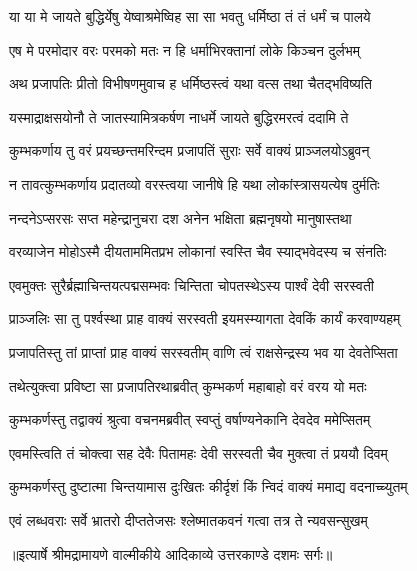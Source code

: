 \twolineshloka
{या या मे जायते बुद्धिर्येषु येष्वाश्रमेष्विह}
{सा सा भवतु धर्मिष्ठा तं तं धर्मं च पालये} %

\twolineshloka
{एष मे परमोदार वरः परमको मतः}
{न हि धर्माभिरक्तानां लोके किञ्चन दुर्लभम्} %

\twolineshloka
{अथ प्रजापतिः प्रीतो विभीषणमुवाच ह}
{धर्मिष्ठस्त्वं यथा वत्स तथा चैतद्भविष्यति} %

\twolineshloka
{यस्माद्राक्षसयोनौ ते जातस्यामित्रकर्षण}
{नाधर्मे जायते बुद्धिरमरत्वं ददामि ते} %

\twolineshloka
{कुम्भकर्णाय तु वरं प्रयच्छन्तमरिन्दम}
{प्रजापतिं सुराः सर्वे वाक्यं प्राञ्जलयोऽब्रुवन्} %

\twolineshloka
{न तावत्कुम्भकर्णाय प्रदातव्यो वरस्त्वया}
{जानीषे हि यथा लोकांस्त्रासयत्येष दुर्मतिः} %

\twolineshloka
{नन्दनेऽप्सरसः सप्त महेन्द्रानुचरा दश}
{अनेन भक्षिता ब्रह्मनृषयो मानुषास्तथा} %

\twolineshloka
{वरव्याजेन मोहोऽस्मै दीयताममितप्रभ}
{लोकानां स्वस्ति चैव स्याद्भवेदस्य च संनतिः} %

\twolineshloka
{एवमुक्तः सुरैर्ब्रह्माचिन्तयत्पद्मसम्भवः}
{चिन्तिता चोपतस्थेऽस्य पार्श्वं देवी सरस्वती} %

\twolineshloka
{प्राञ्जलिः सा तु पर्श्वस्था प्राह वाक्यं सरस्वती}
{इयमस्म्यागता देवकिं कार्यं करवाण्यहम्} %

\twolineshloka
{प्रजापतिस्तु तां प्राप्तां प्राह वाक्यं सरस्वतीम्}
{वाणि त्वं राक्षसेन्द्रस्य भव या देवतेप्सिता} %

\twolineshloka
{तथेत्युक्त्वा प्रविष्टा सा प्रजापतिरथाब्रवीत्}
{कुम्भकर्ण महाबाहो वरं वरय यो मतः} %

\twolineshloka
{कुम्भकर्णस्तु तद्वाक्यं श्रुत्वा वचनमब्रवीत्}
{स्वप्तुं वर्षाण्यनेकानि देवदेव ममेप्सितम्} %

\twolineshloka
{एवमस्त्विति तं चोक्त्वा सह देवैः पितामहः}
{देवी सरस्वती चैव मुक्त्वा तं प्रययौ दिवम्} %

\twolineshloka
{कुम्भकर्णस्तु दुष्टात्मा चिन्तयामास दुःखितः}
{कीर्दृशं किं न्विदं वाक्यं ममाद्य वदनाच्च्युतम्} %

\twolineshloka
{एवं लब्धवराः सर्वे भ्रातरो दीप्ततेजसः}
{श्लेष्मातकवनं गत्वा तत्र ते न्यवसन्सुखम्} %


{॥इत्यार्षे श्रीमद्रामायणे वाल्मीकीये आदिकाव्ये उत्तरकाण्डे दशमः सर्गः॥}


